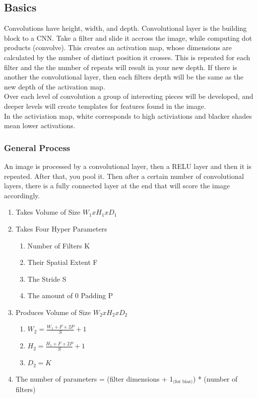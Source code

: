 \documentclass[11pt]{article}
\begin{document}
\subsection{Basics}
\label{sec-2-1}
Convolutions have height, width, and depth. Convolutional layer is the building block to a CNN.
Take a filter and slide it accross the image, while computing dot products (convolve). This creates an
activation map, whose dimensions are calculated by the number of distinct position it crosses. This is repeated
for each filter and the the number of repeats will result in your new depth. If there is another the convolutional layer,
then each filters depth will be the same as the new depth of the activation map. \\
Over each level of convolution a group of interesting pieces will be developed, and deeper levels will create templates for features
found in the image. \\
In the activiation map, white corresponds to high activiations and blacker shades mean lower activations.
\subsubsection{General Process}
\label{sec-2-1-1}
An image is processed by a convolutional layer, then a RELU layer and then it is repeated. After that, you pool it. Then after a certain number of convolutional layers, there is a fully connected layer at the end that will
score the image accordingly.
\begin{enumerate}
\item Takes Volume of Size $W_1 x H_1 x D_1$
\label{sec-2-1-1-1}
\item Takes Four Hyper Parameters
\label{sec-2-1-1-2}
\begin{enumerate}
\item Number of Filters K
\label{sec-2-1-1-2-1}
\item Their Spatial Extent F
\label{sec-2-1-1-2-2}
\item The Stride S
\label{sec-2-1-1-2-3}
\item The amount of 0 Padding P
\label{sec-2-1-1-2-4}
\end{enumerate}
\item Produces Volume of Size $W_2 x H_2 x D_2$
\label{sec-2-1-1-3}
\begin{enumerate}
\item $W_2 = \frac{W_1 + F + 2P}{S} + 1$
\label{sec-2-1-1-3-1}
\item $H_2 = \frac{H_1 + F + 2P}{S} + 1$
\label{sec-2-1-1-3-2}
\item $D_2 = K$
\label{sec-2-1-1-3-3}
\end{enumerate}
\item The number of parameters = (filter dimensions + 1$_{\text{(for bias)}}$) * (number of filters)
\label{sec-2-1-1-4}
\end{enumerate}
\end{document}
